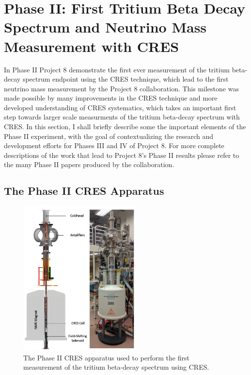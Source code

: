 \section{Phase II: First Tritium Beta Decay Spectrum and Neutrino Mass Measurement with CRES}
\label{sec:chap3-phaseII}

In Phase II Project 8 demonstrate the first ever measurement of the tritium beta-decay spectrum endpoint using the CRES technique, which lead to the first neutrino mass measurement by the Project 8 collaboration. This milestone was made possible by many improvements in the CRES technique and more developed understanding of CRES systematics, which takes an important first step towards larger scale measurments of the tritium beta-decay spectrum with CRES. In this section, I shall briefly describe some the important elements of the Phase II experiment, with the goal of contextualizing the research and development efforts for Phases III and IV of Project 8. For more complete descriptions of the work that lead to Project 8's Phase II results please refer to the many Phase II papers produced by the collaboration.

\subsection{The Phase II CRES Apparatus}

\begin{figure}[htbp]
    \centering
    \includegraphics[width=0.55\textwidth]{figs/Chapter-3/phaseII_system.png}
    \caption{\label{fig:chap3-phase2-apparatus} The Phase II CRES apparatus used to perform the first measurement of the tritium beta-decay spectrum using CRES.}
\end{figure}

